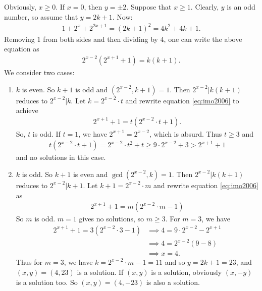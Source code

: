 \documentclass[problems.tex]{subfile}
\begin{document}
	\begin{solution}
		Obviously, $x \ge 0$. If $x = 0$, then $y = \pm 2$. Suppose that $x \ge 1$. Clearly, $y$ is an odd number, so assume that $y = 2k + 1$. Now:
		\begin{align*}
		1 + 2^x + 2^{2x + 1} = (2k + 1)^2 = 4k^2 + 4k + 1.
		\end{align*}
		Removing $1$ from both sides and then dividing by $4$, one can write the above equation as
		\begin{align}\label{eq:imo2006}
		2^{x - 2}(2^{x + 1} + 1) = k(k + 1).
		\end{align}
		We consider two cases:
		\begin{enumerate}
			\item $k$ is even. So $k + 1$ is odd and $(2^{x - 2}, k + 1) = 1$. Then $2^{x - 2}|k(k + 1)$ reduces to $2^{x - 2}|k$. Let $k = 2^{x - 2} \cdot t$ and rewrite equation \eqref{eq:imo2006} to achieve
			\begin{align*}
			2^{x + 1} + 1 = t(2^{x - 2} \cdot t + 1).
			\end{align*}
			So, $t$ is odd. If $t = 1$, we have $2^{x + 1} = 2^{x - 2}$, which is absurd. Thus $t \ge 3$ and
			\begin{align*}
			t(2^{x - 2} \cdot t + 1) = 2^{x - 2} \cdot t^2 + t \ge 9 \cdot 2^{x - 2} + 3 > 2^{x + 1} + 1
			\end{align*}
			and no solutions in this case.
			
			\item $k$ is odd. So $k + 1$ is even and $\gcd(2^{x - 2}, k) = 1$. Then $2^{x - 2}|k(k + 1)$ reduces to $2^{x - 2}|k+1$. Let $k+1 = 2^{x - 2} \cdot m$ and rewrite equation \eqref{eq:imo2006} as
			\begin{align*}
			2^{x + 1} + 1 = m(2^{x - 2} \cdot m - 1)
			\end{align*}
			So $m$ is odd. $m = 1$ gives no solutions, so $m \ge 3$. For $m = 3$, we have
			\begin{align*}
			2^{x + 1} + 1 = 3(2^{x - 2} \cdot 3 - 1) &\implies 4 = 9 \cdot 2^{x - 2} - 2^{x + 1} \\
			&\implies 4 = 2^{x - 2}(9 - 8) \\
			&\implies x = 4.
			\end{align*}
			Thus for $m = 3$, we have $k = 2^{x - 2} \cdot m - 1 = 11$ and so $y = 2k + 1 = 23$, and $(x, y) = (4, 23)$ is a solution. If $(x, y)$ is a solution, obviously $(x, -y)$ is a solution too. So $(x, y) = (4, -23)$ is also a solution.
			

\end{enumerate}
\end{solution}
\end{document}
